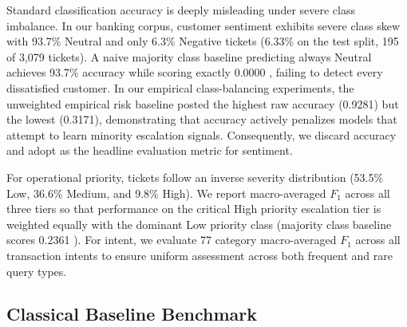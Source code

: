 Standard classification accuracy is deeply misleading under severe class imbalance. In our banking corpus, customer sentiment exhibits severe class skew with 93.7\% Neutral and only 6.3\% Negative tickets (6.33\% on the test split, 195 of 3{,}079 tickets). A naive majority class baseline predicting always Neutral achieves 93.7\% accuracy while scoring exactly 0.0000 \negf{}, failing to detect every dissatisfied customer. In our empirical class-balancing experiments, the unweighted empirical risk baseline posted the highest raw accuracy (0.9281) but the lowest \negf{} (0.3171), demonstrating that accuracy actively penalizes models that attempt to learn minority escalation signals. Consequently, we discard accuracy and adopt \negf{} as the headline evaluation metric for sentiment.

For operational priority, tickets follow an inverse severity distribution (53.5\% Low, 36.6\% Medium, and 9.8\% High). We report macro-averaged $F_1$ across all three tiers so that performance on the critical High priority escalation tier is weighted equally with the dominant Low priority class (majority class baseline scores 0.2361 \macrof{}). For intent, we evaluate 77 category macro-averaged $F_1$ across all transaction intents to ensure uniform assessment across both frequent and rare query types.

\subsection{Classical Baseline Benchmark}

